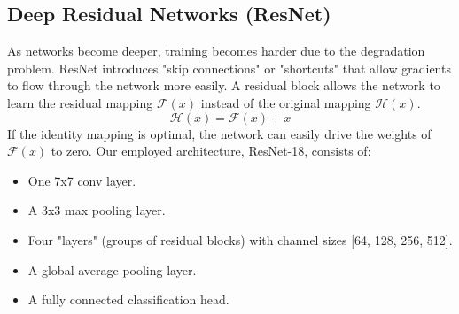 \documentclass[twocolumn,10pt,a4paper]{article}
\begin{document}
\subsection{Deep Residual Networks (ResNet)}
As networks become deeper, training becomes harder due to the degradation problem. ResNet introduces "skip connections" or "shortcuts" that allow gradients to flow through the network more easily.
A residual block allows the network to learn the residual mapping $\mathcal{F}(x)$ instead of the original mapping $\mathcal{H}(x)$.
\begin{equation}
\mathcal{H}(x) = \mathcal{F}(x) + x
\end{equation}
If the identity mapping is optimal, the network can easily drive the weights of $\mathcal{F}(x)$ to zero.
Our employed architecture, ResNet-18, consists of:
\begin{itemize}
    \item One 7x7 conv layer.
    \item A 3x3 max pooling layer.
    \item Four "layers" (groups of residual blocks) with channel sizes [64, 128, 256, 512].
    \item A global average pooling layer.
    \item A fully connected classification head.
\end{itemize}
\end{document}
